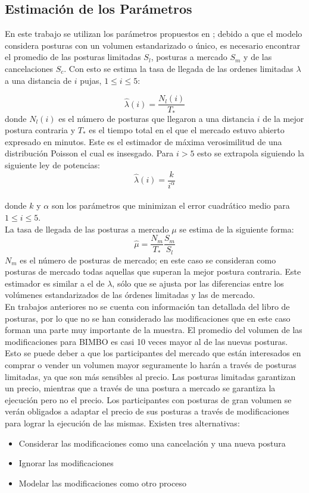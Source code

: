 \documentclass[11pt]{article}
\numberwithin{equation}{section} %
\begin{document}
\clearpage

\subsection{Estimación de los Parámetros}

En este trabajo se utilizan los parámetros propuestos en \cite{Cont2010}; debido a que el modelo considera posturas con un volumen estandarizado o único, es necesario encontrar el promedio de las posturas limitadas $S_l$, posturas a mercado $S_m$ y de las cancelaciones $S_c$. Con esto se estima la tasa de llegada de las ordenes limitadas $\lambda$ a una distancia de $i$ pujas, $1\leq i \leq 5$:

\[
\hat{\lambda}(i)=\frac{N_l(i)}{T_*}
\]
donde $N_l(i)$ es el número de posturas que llegaron a una distancia $i$ de la mejor postura contraria y $T_*$ es el tiempo total en el que el mercado estuvo abierto expresado en minutos. Este es el estimador de máxima verosimilitud de una distribución Poisson el cual es insesgado. Para $i>5$ esto se extrapola siguiendo la siguiente ley de potencias:
\[
\hat{\lambda}(i)=\frac{k}{i^\alpha}
\]\\
donde $k$ y $\alpha$ son los parámetros que minimizan el error cuadrático medio para $1\leq i \leq 5$.\\

La tasa de llegada de las posturas a mercado $\mu$ se estima de la siguiente forma:
\[
\hat{\mu}=\frac{N_m}{T_*}\frac{S_m}{S_l}
\]
$N_m$ es el número de posturas de mercado; en este caso se consideran como posturas de mercado todas aquellas que superan la mejor postura contraria. Este estimador es similar a el de $\lambda$, sólo que se ajusta por las diferencias entre los volúmenes estandarizados de las órdenes limitadas y las de mercado.\\

En trabajos anteriores no se cuenta con información tan detallada del libro de posturas, por lo que no se han considerado las modificaciones que en este caso forman una parte muy importante de la muestra. El promedio del volumen de las modificaciones para BIMBO es casi 10 veces mayor al de las nuevas posturas. Esto se puede deber a que los participantes del mercado que están interesados en comprar o vender un volumen mayor seguramente lo harán a través de posturas limitadas, ya que son más sensibles al precio. Las posturas limitadas garantizan un precio, mientras que a través de una postura a mercado se garantiza la ejecución pero no el precio. Los participantes con posturas de gran volumen se verán obligados a adaptar el precio de sus posturas a través de modificaciones para lograr la ejecución de las mismas. Existen tres alternativas:
\begin{itemize}
  \item Considerar las modificaciones como una cancelación y una nueva postura
  \item Ignorar las modificaciones
  \item Modelar las modificaciones como otro proceso\\
\end{itemize}
\end{document}
